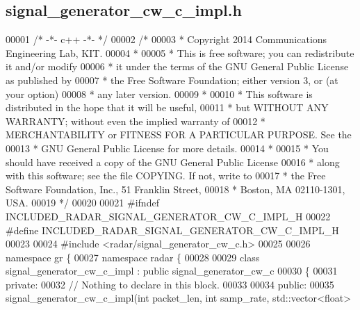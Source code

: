 \subsection{signal\+\_\+generator\+\_\+cw\+\_\+c\+\_\+impl.\+h}
\label{signal__generator__cw__c__impl_8h_source}

\begin{DoxyCode}
00001 \textcolor{comment}{/* -*- c++ -*- */}
00002 \textcolor{comment}{/* }
00003 \textcolor{comment}{ * Copyright 2014 Communications Engineering Lab, KIT.}
00004 \textcolor{comment}{ * }
00005 \textcolor{comment}{ * This is free software; you can redistribute it and/or modify}
00006 \textcolor{comment}{ * it under the terms of the GNU General Public License as published by}
00007 \textcolor{comment}{ * the Free Software Foundation; either version 3, or (at your option)}
00008 \textcolor{comment}{ * any later version.}
00009 \textcolor{comment}{ * }
00010 \textcolor{comment}{ * This software is distributed in the hope that it will be useful,}
00011 \textcolor{comment}{ * but WITHOUT ANY WARRANTY; without even the implied warranty of}
00012 \textcolor{comment}{ * MERCHANTABILITY or FITNESS FOR A PARTICULAR PURPOSE.  See the}
00013 \textcolor{comment}{ * GNU General Public License for more details.}
00014 \textcolor{comment}{ * }
00015 \textcolor{comment}{ * You should have received a copy of the GNU General Public License}
00016 \textcolor{comment}{ * along with this software; see the file COPYING.  If not, write to}
00017 \textcolor{comment}{ * the Free Software Foundation, Inc., 51 Franklin Street,}
00018 \textcolor{comment}{ * Boston, MA 02110-1301, USA.}
00019 \textcolor{comment}{ */}
00020  
00021 \textcolor{preprocessor}{#ifndef INCLUDED\_RADAR\_SIGNAL\_GENERATOR\_CW\_C\_IMPL\_H}
00022 \textcolor{preprocessor}{#define INCLUDED\_RADAR\_SIGNAL\_GENERATOR\_CW\_C\_IMPL\_H}
00023 
00024 \textcolor{preprocessor}{#include <radar/signal_generator_cw_c.h>}
00025 
00026 \textcolor{keyword}{namespace }gr \{
00027   \textcolor{keyword}{namespace }radar \{
00028 
00029     \textcolor{keyword}{class }signal_generator_cw_c_impl : \textcolor{keyword}{public} signal_generator_cw_c
00030     \{
00031      \textcolor{keyword}{private}:
00032       \textcolor{comment}{// Nothing to declare in this block.}
00033 
00034      \textcolor{keyword}{public}:
00035       signal_generator_cw_c_impl(\textcolor{keywordtype}{int} packet\_len, \textcolor{keywordtype}{int} samp_rate, std::vector<float> 

\end{DoxyCode}
